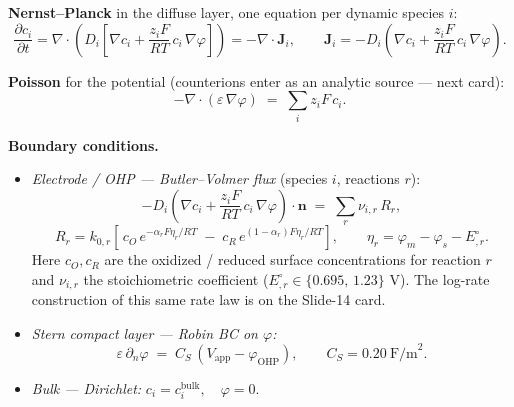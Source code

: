 \documentclass[11pt]{article}
\newcommand{\Eeq}{E^{\circ}}
\newcommand{\CS}{C_{S}}
\newcommand{\Jbf}{\mathbf{J}}
\newcommand{\nbf}{\mathbf{n}}
\begin{document}
\begin{tcolorbox}[cardstyle={Slide 12 --- The PNP--BV model (governing equations + every BC)}]
\textbf{Nernst--Planck} in the diffuse layer, one equation per dynamic
species $i$:
\[
  \frac{\partial c_i}{\partial t}
   = \nabla\!\cdot\!\left(D_i\!\left[\nabla c_i
      + \frac{z_i F}{RT}\,c_i\,\nabla\varphi\right]\right)
   = -\nabla\!\cdot\Jbf_i,
  \qquad
  \Jbf_i = -D_i\!\left(\nabla c_i + \frac{z_i F}{RT}\,c_i\,\nabla\varphi\right).
\]

\textbf{Poisson} for the potential (counterions enter as an analytic
source --- next card):
\[
  -\nabla\!\cdot(\varepsilon\,\nabla\varphi) \;=\; \sum_i z_i F\,c_i .
\]

\textbf{Boundary conditions.}
\begin{itemize}
  \item \emph{Electrode / OHP --- Butler--Volmer flux} (species $i$,
        reactions $r$):
  \[
    -D_i\!\left(\nabla c_i + \frac{z_i F}{RT}\,c_i\,\nabla\varphi\right)\!\cdot\nbf
    \;=\; \sum_r \nu_{i,r}\,R_r,
  \]
  \[
    R_r = k_{0,r}\!\left[\,c_O\,e^{-\alpha_r F\eta_r/RT}
                       \;-\; c_R\,e^{(1-\alpha_r)F\eta_r/RT}\right],
    \qquad
    \eta_r = \varphi_m - \varphi_s - \Eeq_{,r}.
  \]
  Here $c_O,c_R$ are the oxidized / reduced surface concentrations for
  reaction $r$ and $\nu_{i,r}$ the stoichiometric coefficient
  ($\Eeq_{,r}\in\{0.695,\,1.23\}$ V). The log-rate construction of this
  same rate law is on the Slide-14 card.
  \item \emph{Stern compact layer --- Robin BC on $\varphi$:}
  \[
    \varepsilon\,\partial_n\varphi \;=\; \CS\,(V_{\mathrm{app}} - \varphi_{\mathrm{OHP}}),
    \qquad \CS = 0.20~\text{F/m}^2 .
  \]
  \item \emph{Bulk --- Dirichlet:}\quad
  $c_i = c_i^{\mathrm{bulk}}, \quad \varphi = 0.$
\end{itemize}
\end{tcolorbox}
\end{document}
